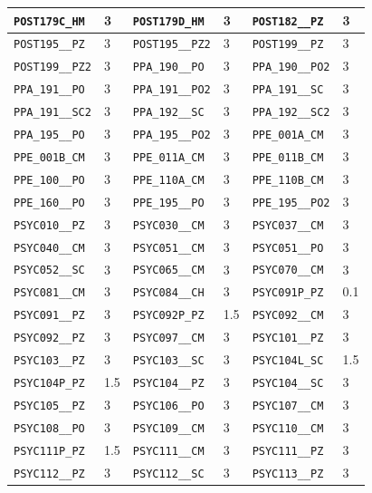 \begin{longtable}{|l|l||l|l||l|l|}
    \verb|POST179C_HM| & 3 & \verb|POST179D_HM| & 3 & \verb|POST182__PZ| & 3\\\hline
    \verb|POST195__PZ| & 3 & \verb|POST195__PZ2| & 3 & \verb|POST199__PZ| & 3\\\hline
    \verb|POST199__PZ2| & 3 & \verb|PPA_190__PO| & 3 & \verb|PPA_190__PO2| & 3\\\hline
    \verb|PPA_191__PO| & 3 & \verb|PPA_191__PO2| & 3 & \verb|PPA_191__SC| & 3\\\hline
    \verb|PPA_191__SC2| & 3 & \verb|PPA_192__SC| & 3 & \verb|PPA_192__SC2| & 3\\\hline
    \verb|PPA_195__PO| & 3 & \verb|PPA_195__PO2| & 3 & \verb|PPE_001A_CM| & 3\\\hline
    \verb|PPE_001B_CM| & 3 & \verb|PPE_011A_CM| & 3 & \verb|PPE_011B_CM| & 3\\\hline
    \verb|PPE_100__PO| & 3 & \verb|PPE_110A_CM| & 3 & \verb|PPE_110B_CM| & 3\\\hline
    \verb|PPE_160__PO| & 3 & \verb|PPE_195__PO| & 3 & \verb|PPE_195__PO2| & 3\\\hline
    \verb|PSYC010__PZ| & 3 & \verb|PSYC030__CM| & 3 & \verb|PSYC037__CM| & 3\\\hline
    \verb|PSYC040__CM| & 3 & \verb|PSYC051__CM| & 3 & \verb|PSYC051__PO| & 3\\\hline
    \verb|PSYC052__SC| & 3 & \verb|PSYC065__CM| & 3 & \verb|PSYC070__CM| & 3\\\hline
    \verb|PSYC081__CM| & 3 & \verb|PSYC084__CH| & 3 & \verb|PSYC091P_PZ| & 0.1\\\hline
    \verb|PSYC091__PZ| & 3 & \verb|PSYC092P_PZ| & 1.5 & \verb|PSYC092__CM| & 3\\\hline
    \verb|PSYC092__PZ| & 3 & \verb|PSYC097__CM| & 3 & \verb|PSYC101__PZ| & 3\\\hline
    \verb|PSYC103__PZ| & 3 & \verb|PSYC103__SC| & 3 & \verb|PSYC104L_SC| & 1.5\\\hline
    \verb|PSYC104P_PZ| & 1.5 & \verb|PSYC104__PZ| & 3 & \verb|PSYC104__SC| & 3\\\hline
    \verb|PSYC105__PZ| & 3 & \verb|PSYC106__PO| & 3 & \verb|PSYC107__CM| & 3\\\hline
    \verb|PSYC108__PO| & 3 & \verb|PSYC109__CM| & 3 & \verb|PSYC110__CM| & 3\\\hline
    \verb|PSYC111P_PZ| & 1.5 & \verb|PSYC111__CM| & 3 & \verb|PSYC111__PZ| & 3\\\hline
    \verb|PSYC112__PZ| & 3 & \verb|PSYC112__SC| & 3 & \verb|PSYC113__PZ| & 3\\\hline

\end{longtable}
